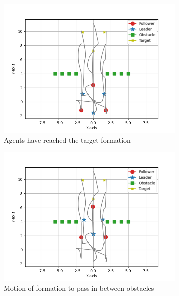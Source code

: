 \documentclass[a4paper,11pt,oneside]{book}
\begin{document}
\begin{figure}[h]
\centering
	\begin{subfigure}{0.32\textwidth}	
	\includegraphics[width=\textwidth]{Hexagon_obstacle_Initial.jpg}
	\caption{Agents have reached the target formation}
	\end{subfigure}
\hfill
	\begin{subfigure}{0.32\textwidth}	
	\includegraphics[width=\textwidth]{Hexagon_obstacle.jpg}
	\caption{Motion of formation to pass in between obstacles}
	\end{subfigure}
\hfill
	\begin{subfigure}{0.32\textwidth}	

\end{subfigure}
\end{figure}
\end{document}
